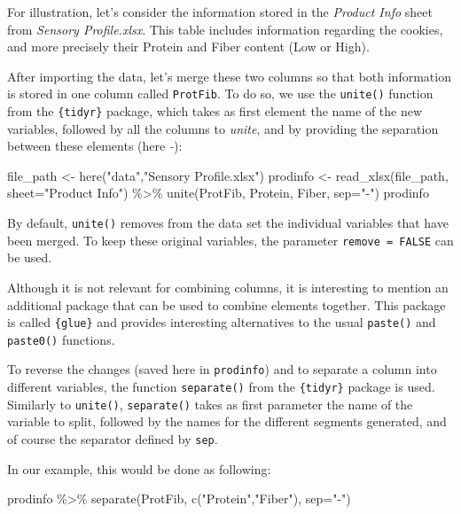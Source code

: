 \documentclass[
]{book}
\newenvironment{Shaded}{\begin{snugshade}}{\end{snugshade}}
\newcommand{\AttributeTok}[1]{\textcolor[rgb]{0.77,0.63,0.00}{#1}}
\newcommand{\FunctionTok}[1]{\textcolor[rgb]{0.00,0.00,0.00}{#1}}
\newcommand{\NormalTok}[1]{#1}
\newcommand{\OtherTok}[1]{\textcolor[rgb]{0.56,0.35,0.01}{#1}}
\newcommand{\SpecialCharTok}[1]{\textcolor[rgb]{0.00,0.00,0.00}{#1}}
\newcommand{\StringTok}[1]{\textcolor[rgb]{0.31,0.60,0.02}{#1}}
\begin{document}
For illustration, let's consider the information stored in the \emph{Product Info} sheet from \emph{Sensory Profile.xlsx}. This table includes information regarding the cookies, and more precisely their Protein and Fiber content (Low or High).

After importing the data, let's merge these two columns so that both information is stored in one column called \texttt{ProtFib}.
To do so, we use the \texttt{unite()} function from the \texttt{\{tidyr\}} package, which takes as first element the name of the new variables, followed by all the columns to \emph{unite}, and by providing the separation between these elements (here \emph{-}):

\begin{Shaded}
\begin{Highlighting}[]
\NormalTok{file\_path }\OtherTok{\textless{}{-}} \FunctionTok{here}\NormalTok{(}\StringTok{"data"}\NormalTok{,}\StringTok{"Sensory Profile.xlsx"}\NormalTok{) }
\NormalTok{prodinfo }\OtherTok{\textless{}{-}} \FunctionTok{read\_xlsx}\NormalTok{(file\_path, }\AttributeTok{sheet=}\StringTok{"Product Info"}\NormalTok{) }\SpecialCharTok{\%\textgreater{}\%}  
  \FunctionTok{unite}\NormalTok{(ProtFib, Protein, Fiber, }\AttributeTok{sep=}\StringTok{"{-}"}\NormalTok{)}
\NormalTok{prodinfo}
\end{Highlighting}
\end{Shaded}

By default, \texttt{unite()} removes from the data set the individual variables that have been merged. To keep these original variables, the parameter \texttt{remove\ =\ FALSE} can be used.

Although it is not relevant for combining columns, it is interesting to mention an additional package that can be used to combine elements together. This package is called \texttt{\{glue\}} and provides interesting alternatives to the usual \texttt{paste()} and \texttt{paste0()} functions.

To reverse the changes (saved here in \texttt{prodinfo}) and to separate a column into different variables, the function \texttt{separate()} from the \texttt{\{tidyr\}} package is used. Similarly to \texttt{unite()}, \texttt{separate()} takes as first parameter the name of the variable to split, followed by the names for the different segments generated, and of course the separator defined by \texttt{sep}.

In our example, this would be done as following:

\begin{Shaded}
\begin{Highlighting}[]
\NormalTok{prodinfo }\SpecialCharTok{\%\textgreater{}\%} 
  \FunctionTok{separate}\NormalTok{(ProtFib, }\FunctionTok{c}\NormalTok{(}\StringTok{"Protein"}\NormalTok{,}\StringTok{"Fiber"}\NormalTok{), }\AttributeTok{sep=}\StringTok{"{-}"}\NormalTok{)}
\end{Highlighting}
\end{Shaded}
\end{document}
